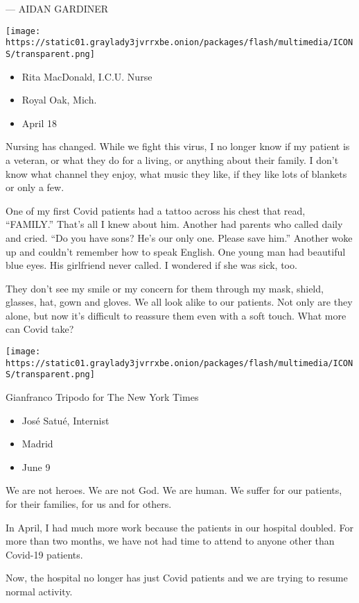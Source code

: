 --- AIDAN GARDINER

\texttt{[image: https://static01.graylady3jvrrxbe.onion/packages/flash/multimedia/ICONS/transparent.png]}

\begin{itemize}
\tightlist
\item
  Rita MacDonald, I.C.U. Nurse
\item
  Royal Oak, Mich.
\item
  April 18
\end{itemize}

Nursing has changed. While we fight this virus, I no longer know if my
patient is a veteran, or what they do for a living, or anything about
their family. I don't know what channel they enjoy, what music they
like, if they like lots of blankets or only a few.

One of my first Covid patients had a tattoo across his chest that read,
``FAMILY.'' That's all I knew about him. Another had parents who called
daily and cried. ``Do you have sons? He's our only one. Please save
him.'' Another woke up and couldn't remember how to speak English. One
young man had beautiful blue eyes. His girlfriend never called. I
wondered if she was sick, too.

They don't see my smile or my concern for them through my mask, shield,
glasses, hat, gown and gloves. We all look alike to our patients. Not
only are they alone, but now it's difficult to reassure them even with a
soft touch. What more can Covid take?

\texttt{[image: https://static01.graylady3jvrrxbe.onion/packages/flash/multimedia/ICONS/transparent.png]}

Gianfranco Tripodo for The New York Times

\begin{itemize}
\tightlist
\item
  José Satué, Internist
\item
  Madrid
\item
  June 9
\end{itemize}

We are not heroes. We are not God. We are human. We suffer for our
patients, for their families, for us and for others.

In April, I had much more work because the patients in our hospital
doubled. For more than two months, we have not had time to attend to
anyone other than Covid-19 patients.

Now, the hospital no longer has just Covid patients and we are trying to
resume normal activity.

